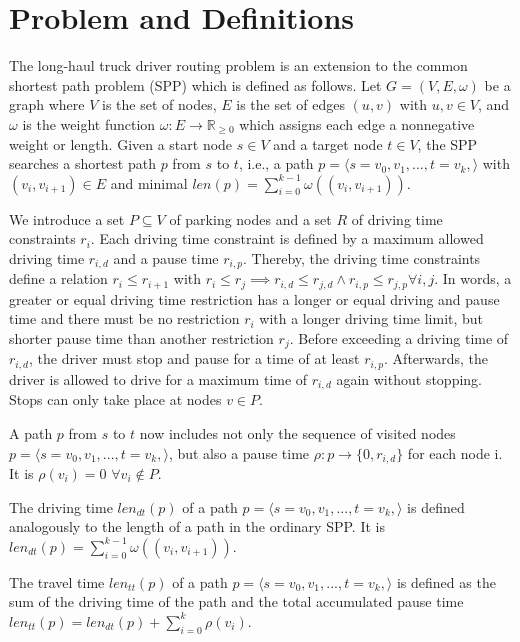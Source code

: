 \chapter{Problem and Definitions}
The long-haul truck driver routing problem is an extension to the common shortest path problem (SPP) which is defined as follows. Let $G=(V,E,\omega)$ be a graph where $V$ is the set of nodes, $E$ is the set of edges $(u,v)$ with $u,v \in V$, and $\omega$ is the weight function $\omega: E \rightarrow \mathbb{R}_{\ge 0}$ which assigns each edge a nonnegative weight or length. Given a start node $s \in V$ and a target node $t \in V$, the SPP searches a shortest path $p$ from $s$ to $t$, i.e., a path $p = \langle s=v_0,v_1,...,t=v_k, \rangle$ with $(v_i,v_{i+1}) \in E$ and minimal $len(p) = \sum_{i=0}^{k-1} \omega((v_{i}, v_{i+1}))$.

We introduce a set $P \subseteq V$ of parking nodes and a set $R$ of driving time constraints $r_i$. Each driving time constraint is defined by a maximum allowed driving time $r_{i,d}$ and a pause time $r_{i,p}$. Thereby, the driving time constraints define a relation $r_i \le r_{i+1}$ with $r_i \le r_j \implies r_{i,d} \le r_{j,d} \land  r_{i,p} \le r_{j,p} \forall i,j$. In words, a greater or equal driving time restriction has a longer or equal driving and pause time and there must be no restriction $r_i$ with a longer driving time limit, but shorter pause time than another restriction $r_j$. Before exceeding a driving time of $r_{i,d}$, the driver must stop and pause for a time of at least $r_{i,p}$. Afterwards, the driver is allowed to drive for a maximum time of $r_{i,d}$ again without stopping. Stops can only take place at nodes $v \in P$.

A path $p$ from $s$ to $t$ now includes not only the sequence of visited nodes $p = \langle s=v_0,v_1,...,t=v_k, \rangle$, but also a pause time $\rho: p \rightarrow \{0,r_{i,d}\}$ for each node i. It is $\rho(v_i) = 0$ $\forall v_i \notin P$.

\begin{definition}
	The driving time $len_{dt}(p)$ of a path  $p = \langle s=v_0,v_1,...,t=v_k, \rangle$ is defined analogously to the length of a path in the ordinary SPP. It is $len_{dt}(p) = \sum_{i=0}^{k-1} \omega((v_{i}, v_{i+1}))$.
\end{definition}

\begin{definition}
	The travel time $len_{tt}(p)$ of a path  $p = \langle s=v_0,v_1,...,t=v_k, \rangle$ is defined as the sum of the driving time of the path and the total accumulated pause time $len_{tt}(p) = len_{dt}(p) + \sum_{i=0}^{k} \rho(v_i)$.
\end{definition}

